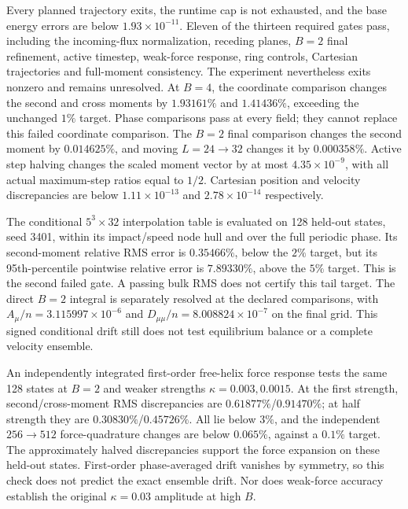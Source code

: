 \documentclass[11pt,letterpaper]{article}
\begin{document}
Every planned trajectory exits, the runtime cap is not exhausted, and
the base energy errors are below $1.93\times10^{-11}$. Eleven of the
thirteen required gates pass, including the incoming-flux normalization,
receding planes, $B=2$ final refinement, active timestep, weak-force response,
ring controls, Cartesian trajectories and full-moment consistency. The
experiment nevertheless exits nonzero and remains unresolved. At $B=4$,
the coordinate comparison changes the second and cross moments by
$1.93161\%$ and $1.41436\%$, exceeding the unchanged $1\%$ target.
Phase comparisons pass at every field; they cannot replace this failed
coordinate comparison. The $B=2$ final comparison changes the second
moment by $0.014625\%$, and moving $L=24\to32$ changes it by
$0.000358\%$. Active step halving changes the scaled moment vector by
at most $4.35\times10^{-9}$, with all actual maximum-step ratios equal
to $1/2$. Cartesian position and velocity discrepancies are below
$1.11\times10^{-13}$ and $2.78\times10^{-14}$ respectively.

The conditional $5^3\times32$ interpolation table is evaluated on 128
held-out states, seed 3401, within its impact/speed node hull and over
the full periodic phase. Its second-moment relative RMS error is
$0.35466\%$, below the $2\%$ target, but its 95th-percentile pointwise
relative error is $7.89330\%$, above the $5\%$ target. This is the
second failed gate. A passing bulk RMS does not certify this tail target.
The direct $B=2$ integral is separately resolved at the declared
comparisons, with $A_\mu/n=3.115997\times10^{-6}$ and
$D_{\mu\mu}/n=8.008824\times10^{-7}$ on the final grid. This signed
conditional drift still does not test equilibrium balance or a complete
velocity ensemble.

An independently integrated first-order free-helix force response tests
the same 128 states at $B=2$ and weaker strengths $\kappa=0.003,0.0015$.
At the first strength, second/cross-moment RMS discrepancies are
$0.61877\%$/$0.91470\%$; at half strength they are
$0.30830\%$/$0.45726\%$. All lie below $3\%$, and the independent
$256\to512$ force-quadrature changes are below $0.065\%$, against a
$0.1\%$ target. The approximately halved discrepancies support the
force expansion on these held-out states. First-order phase-averaged
drift vanishes by symmetry, so this check does not predict the exact
ensemble drift. Nor does weak-force accuracy establish the original
$\kappa=0.03$ amplitude at high $B$.
\end{document}
